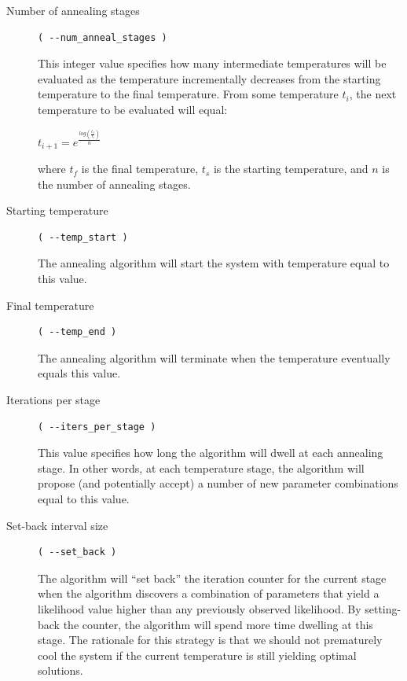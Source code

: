 \documentclass[11pt]{article}
\begin{document}
\begin{description}

\item[Number of annealing stages]
\begin{verbatim}
( --num_anneal_stages )
\end{verbatim}

This integer value specifies how many intermediate temperatures will be evaluated as the temperature incrementally decreases from the starting temperature to the final temperature.  From some temperature $t_i$, the next temperature to be evaluated will equal:

$t_{i+1} = e^{ \frac{  log(\frac{t_f}{t_s})  }{  n   }   }$

where $t_f$ is the final temperature, $t_s$ is the starting temperature, and $n$ is the number of annealing stages.

\item[Starting temperature]
\begin{verbatim}
( --temp_start )
\end{verbatim}

The annealing algorithm will start the system with temperature equal to this value.

\item[Final temperature] 
\begin{verbatim}
( --temp_end )
\end{verbatim}

The annealing algorithm will terminate when the temperature eventually equals this value.

\item[Iterations per stage]
\begin{verbatim}
( --iters_per_stage )
\end{verbatim}

This value specifies how long the algorithm will dwell at each annealing stage.  In other words, at each temperature stage, the algorithm will propose (and potentially accept) a number of new parameter combinations equal to this value.

\item[Set-back interval size] 
\begin{verbatim}
( --set_back )
\end{verbatim}

The algorithm will ``set back'' the iteration counter for the current stage when the algorithm discovers a combination of parameters that yield a likelihood value higher than any previously observed likelihood.  By setting-back the counter, the algorithm will spend more time dwelling at this stage.  The rationale for this strategy is that we should not prematurely cool the system if the current temperature is still yielding optimal solutions.


\end{description}
\end{document}
